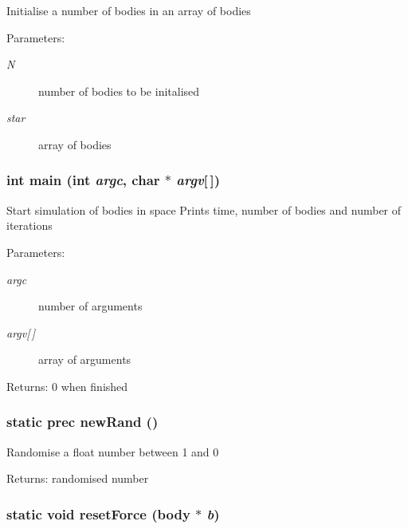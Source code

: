 Initialise a number of bodies in an array of bodies \begin{Desc}
\item[Parameters:]
\begin{description}
\item[{\em N}]number of bodies to be initalised \item[{\em star}]array of bodies \end{description}
\end{Desc}
\hypertarget{main-iter_8c_0ddf1224851353fc92bfbff6f499fa97}{
\subsubsection[{main}]{\setlength{\rightskip}{0pt plus 5cm}int main (int {\em argc}, \/  char $\ast$ {\em argv}\mbox{[}$\,$\mbox{]})}}
\label{main-iter_8c_0ddf1224851353fc92bfbff6f499fa97}


Start simulation of bodies in space Prints time, number of bodies and number of iterations \begin{Desc}
\item[Parameters:]
\begin{description}
\item[{\em argc}]number of arguments \item[{\em argv\mbox{[}$\,$\mbox{]}}]array of arguments \end{description}
\end{Desc}
\begin{Desc}
\item[Returns:]0 when finished \end{Desc}
\hypertarget{main-iter_8c_656b0e6c956991a96f0f8aa88341f618}{
\subsubsection[{newRand}]{\setlength{\rightskip}{0pt plus 5cm}static prec newRand ()}}
\label{main-iter_8c_656b0e6c956991a96f0f8aa88341f618}


Randomise a float number between 1 and 0 \begin{Desc}
\item[Returns:]randomised number \end{Desc}
\hypertarget{main-iter_8c_3c505f52b191ad162e80d25858fdd098}{
\subsubsection[{resetForce}]{\setlength{\rightskip}{0pt plus 5cm}static void resetForce (body $\ast$ {\em b})}}
\label{main-iter_8c_3c505f52b191ad162e80d25858fdd098}


